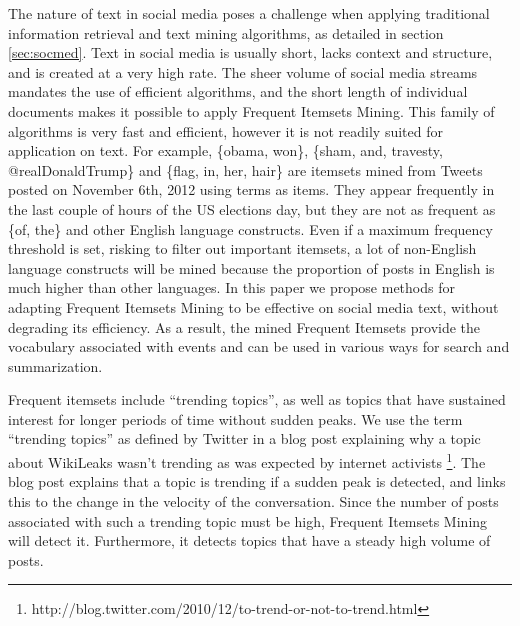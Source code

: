 \documentclass{sig-alternate}
\begin{document}
The nature of text in social media poses a challenge when applying traditional information retrieval and text mining algorithms, as detailed in section \ref{sec:socmed}. Text in social media is usually short, lacks context and structure, and is created at a very high rate. The sheer volume of social media streams mandates the use of efficient algorithms, and the short length of individual documents makes it possible to apply Frequent Itemsets Mining. This family of algorithms is very fast and efficient, however it is not readily suited for application on text. For example, \{obama, won\}, \{sham, and, travesty, @realDonaldTrump\} and \{flag, in, her, hair\}  are  itemsets mined from Tweets posted on November 6th, 2012 using terms as items. They appear frequently in the last couple of hours of the US elections day, but they are not as frequent as \{of, the\} and other English language constructs. Even if a maximum frequency threshold is set, risking to filter out important itemsets, a lot of non-English language constructs will be mined because the proportion of posts in English is much higher than other languages. In this paper we propose methods for adapting Frequent Itemsets Mining to be effective on social media text, without degrading its efficiency. As a result, the mined Frequent Itemsets provide the vocabulary associated with events and can be used in various ways for search and summarization.

Frequent itemsets include ``trending topics'', as well as topics that have sustained interest for longer periods of time without sudden peaks. We use the term ``trending topics'' as defined by Twitter in a blog post explaining why a topic about WikiLeaks wasn't trending as was expected by internet activists \footnote{http://blog.twitter.com/2010/12/to-trend-or-not-to-trend.html}. The blog post explains that a topic is trending if a sudden peak is detected, and links this to the change in the velocity of the conversation. Since the number of posts associated with such a trending topic must be high, Frequent Itemsets Mining will detect it. Furthermore, it detects topics that have a steady high volume of posts.
\end{document}
